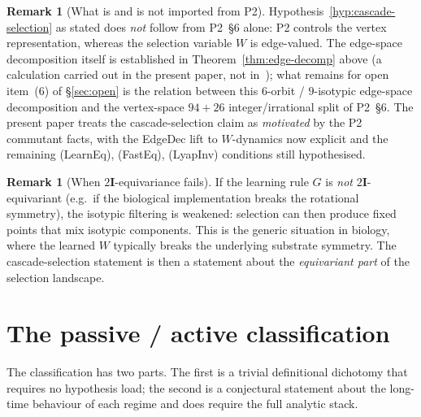 \documentclass[11pt]{article}
\theoremstyle{definition}
\newtheorem{remark}[theorem]{Remark}
\newcommand{\twoI}{2\mathbf{I}}
\begin{document}
\begin{remark}[What is and is not imported from P2]
Hypothesis~\ref{hyp:cascade-selection} as stated does \emph{not} follow from P2~\S 6 alone: P2 controls the vertex representation, whereas the selection variable $W$ is edge-valued. The edge-space decomposition itself is established in Theorem~\ref{thm:edge-decomp} above (a calculation carried out in the present paper, not in~\citep{CascadeAlgSubstrate}); what remains for open item~(6) of \S\ref{sec:open} is the relation between this $6$-orbit / $9$-isotypic edge-space decomposition and the vertex-space $94 + 26$ integer/irrational split of P2~\S 6. The present paper treats the cascade-selection claim as \emph{motivated} by the P2 commutant facts, with the EdgeDec lift to $W$-dynamics now explicit and the remaining (LearnEq), (FastEq), (LyapInv) conditions still hypothesised.
\end{remark}

\begin{remark}[When $\twoI$-equivariance fails]
If the learning rule $G$ is \emph{not} $\twoI$-equivariant (e.g.\ if the biological implementation breaks the rotational symmetry), the isotypic filtering is weakened: selection can then produce fixed points that mix isotypic components. This is the generic situation in biology, where the learned $W$ typically breaks the underlying substrate symmetry. The cascade-selection statement is then a statement about the \emph{equivariant part} of the selection landscape.
\end{remark}

\section{The passive / active classification}\label{sec:classification}

The classification has two parts. The first is a trivial definitional dichotomy that requires no hypothesis load; the second is a conjectural statement about the long-time behaviour of each regime and does require the full analytic stack.
\end{document}
